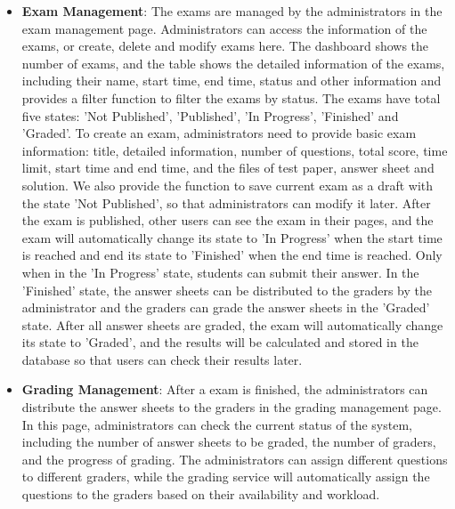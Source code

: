 \documentclass[12pt]{article}
\begin{document}
\begin{itemize}
    \item \textbf{Exam Management}: The exams are managed by the administrators in the exam management page. Administrators can access the information of the exams, or create, delete and modify exams here. The dashboard shows the number of exams, and the table shows the detailed information of the exams, including their name, start time, end time, status and other information and provides a filter function to filter the exams by status. The exams have total five states: 'Not Published', 'Published', 'In Progress', 'Finished' and 'Graded'. To create an exam, administrators need to provide basic exam information: title, detailed information, number of questions, total score, time limit, start time and end time, and the files of test paper, answer sheet and solution. We also provide the function to save current exam as a draft with the state 'Not Published', so that administrators can modify it later. After the exam is published, other users can see the exam in their pages, and the exam will automatically change its state to 'In Progress' when the start time is reached and end its state to 'Finished' when the end time is reached. Only when in the 'In Progress' state, students can submit their answer. In the 'Finished' state, the answer sheets can be distributed to the graders by the administrator and the graders can grade the answer sheets in the 'Graded' state. After all answer sheets are graded, the exam will automatically change its state to 'Graded', and the results will be calculated and stored in the database so that users can check their results later.
    
    \item \textbf{Grading Management}: After a exam is finished, the administrators can distribute the answer sheets to the graders in the grading management page. In this page, administrators can check the current status of the system, including the number of answer sheets to be graded, the number of graders, and the progress of grading. The administrators can assign different questions to different graders, while the grading service will automatically assign the questions to the graders based on their availability and workload.
\end{itemize}
\end{document}
